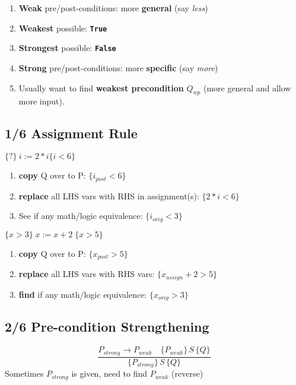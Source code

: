 {\footnotesize
\begin{enumerate}
\item \textbf{Weak} pre/post-conditions: more \textbf{general} (say \emph{less})
\item \textbf{Weakest} possible: \textbf{\texttt{True}}
\item \textbf{Strongest} possible: \textbf{\texttt{False}}
\item \textbf{Strong} pre/post-conditions: more \textbf{specific} (say \emph{more})
\item Usually want to find \textbf{weakest precondition} $Q_{wp}$ (more general and allow more input).
\end{enumerate}
\subsection*{1/6 Assignment Rule}
\begin{minipage}{0.45\linewidth}
  {\centering \(\{?\}\ i := 2 * i \{i < 6\}\)}
\begin{enumerate}
\item \textbf{copy} Q over to P: \(\{i_{post} < 6\}\)
\item \textbf{replace} all LHS vars with RHS in assignment(s): \(\{2 * i < 6\}\)
\item See if any math/logic equivalence: \(\{i_{orig} < 3\}\)
\end{enumerate}
\end{minipage}
\begin{minipage}{0.45\linewidth}
  {\centering \(\{x > 3\}\;x:=x+2\;\{x>5\}\)}
\begin{enumerate}
\item \textbf{copy} Q over to P: \(\{x_{post} > 5\}\)
\item \textbf{replace} all LHS vars with RHS vars: \(\{x_{assign}+2 > 5\}\)
\item \textbf{find} if any math/logic equivalence: \(\{x_{orig} > 3\}\)
\end{enumerate}
\end{minipage}

\subsection*{2/6 Pre-condition Strengthening}
\begin{displaymath}
  \frac{P_{strong} \rightarrow P_{weak} \quad \{P_{weak}\}\,S\,\{Q\} } {\{P_{strong}\}\,S\,\{Q\}}
\end{displaymath}
Sometimes $P_{strong}$ is given, need to find $P_{weak}$ (reverse)
}
